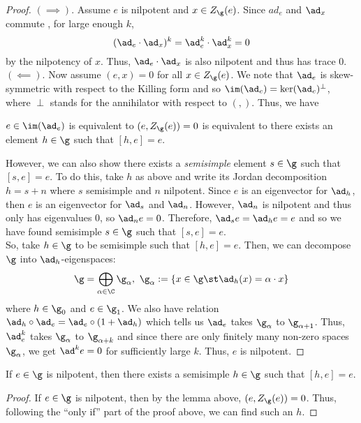 \begin{proof}
  \((\implies)\). Assume \(e\) is nilpotent and \(x \in Z_\g(e)\). Since \(ad_e\) and
  \(\ad_x\) commute , for large enough \(k\), \[
    (\ad_e \cdot \ad_x)^k = \ad^k_e \cdot \ad^k_x = 0
  \]
  by the nilpotency of \(x\). Thus, \(\ad_e \cdot \ad_x\) is also
  nilpotent and thus has trace \(0\). \\

  \((\impliedby)\). Now assume \((e,x) = 0\) for all \(x \in
  Z_\g(e)\). We note that \(\ad_e\) is 
  skew-symmetric with respect to the Killing form and so
  \(\im(\ad_e) = \ker (\ad_e)^\perp\), where \(\perp\) stands for
  the annihilator with respect to \((,)\). Thus, we have
  \begin{lem}
    \(e \in
  \im(\ad_e)\) is equivalent to \((e,Z_\g(e)) = 0\) is equivalent to
  there exists an 
  element \(h \in \g\) such that \([h,e]=e\).
  \end{lem}
  However, we can also show there exists a \emph{semisimple} element
  \(s \in \g\) such that \([s,e] = e\). To do this, take \(h\) as
  above and write its Jordan decomposition \(h = s + n\) where \(s\)
  semisimple and \(n\) nilpotent. Since \(e\) is an eigenvector for
  \(\ad_h\), then \(e\) is an eigenvector for \(\ad_s\) and
  \(\ad_n\). However, \(\ad_n\) is nilpotent and thus only has
  eigenvalues \(0\), so \(\ad_n e = 0\). Therefore, \(\ad_s e = \ad_h
  e = e\) and so we have found semisimple \(s \in \g\) such that
  \([s,e] = e\). \\

  So, take \(h \in \g\) to be semisimple such that \([h,e] =
  e\). Then, we can decompose \(\g\) into \(\ad_h\)-eigenspaces: \[
    \g = \bigoplus_{\alpha \in \C} \g_\alpha, \ \g_\alpha := \{x \in
    \g \st \ad_h(x) = \alpha \cdot x\}
  \]
  where \(h \in \g_0\) and \(e \in \g_1\). We also have relation
  \(\ad_h \circ \ad_e = \ad_e \circ (1+\ad_h)\) which tells us
  \(\ad_e\) takes \(\g_\alpha\) to \(\g_{\alpha+1}\). Thus,
  \(\ad^k_e\) takes \(\g_\alpha\) to \(\g_{\alpha+k}\) and since there
  are only finitely many non-zero spaces \(\g_\alpha\), we get \(\ad^k
  e = 0\) for sufficiently large \(k\). Thus, \(e\) is nilpotent.
\end{proof}
\begin{lem}
  If \(e \in \g\) is nilpotent, then there exists a semisimple \(h \in
  \g\) such that \([h,e] = e\).
\end{lem}
\begin{proof}
  If \(e \in \g\) is nilpotent, then by the lemma above, \((e,
  Z_\g(e)) = 0\). Thus, following the ``only if'' part of the proof
  above, we can find such an \(h\).
\end{proof}
